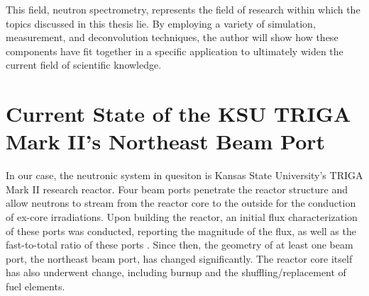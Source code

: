 This field, neutron spectrometry, represents the field of research within which the topics discussed in this thesis lie.
By employing a variety of simulation, measurement, and deconvolution techniques, the author will show how these components have fit together in a specific application to ultimately widen the current field of scientific knowledge.



\section{Current State of the KSU TRIGA Mark II's Northeast Beam Port}
In our case, the neutronic system in quesiton is Kansas State University's TRIGA Mark II research reactor.
Four beam ports penetrate the reactor structure and allow neutrons to stream from the reactor core to the outside for the conduction of ex-core irradiations.
Upon building the reactor, an initial flux characterization of these ports was conducted, reporting the magnitude of the flux, as well as the fast-to-total ratio of these ports \cite{bouchey1967experimental}.
Since then, the geometry of at least one beam port, the northeast beam port, has changed significantly.
The reactor core itself has also underwent change, including burnup and the shuffling/replacement of fuel elements.

